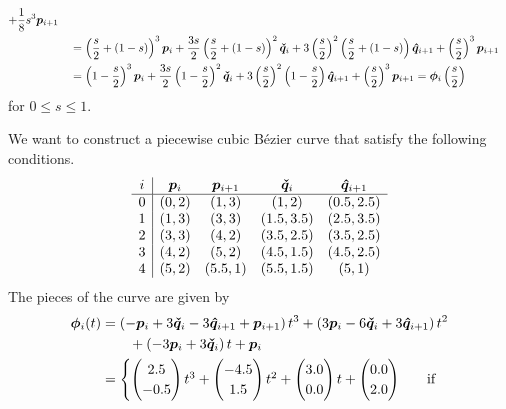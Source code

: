\begin{rmk}
\begin{align*}
+ \frac{1}{8} s^3 \bm{p}_{i+1} \\
&\quad = \left( \frac{s}{2}+(1-s) \right)^3 \bm{p}_i +
\frac{3s}{2}\left(\frac{s}{2} + (1-s) \right)^2 \bm{\check{q}}_i +
3 \left( \frac{s}{2} \right)^2\left(\frac{s}{2}+(1-s) \right)
\bm{\hat{q}}_{i+1} + \left( \frac{s}{2} \right)^3 \bm{p}_{i+1} \\
&\quad = \left( 1 -\frac{s}{2}\right)^3 \bm{p}_i +
\frac{3s}{2}\left( 1- \frac{s}{2}\right)^2 \bm{\check{q}}_i +
3 \left( \frac{s}{2} \right)^2\left(1 - \frac{s}{2}\right) \bm{\hat{q}}_{i+1}
+ \left( \frac{s}{2} \right)^3 \bm{p}_{i+1}
= \bm{\phi}_i\left(\frac{s}{2}\right)
\end{align*}
for $0 \leq s \leq 1$.
\end{rmk}

\begin{egg}
We want to construct a piecewise cubic Bézier curve that satisfy the
following conditions.
\[
\begin{array}{c|cccc}
i & \bm{p}_i & \bm{p}_{i+1} & \bm{\check{q}}_i & \bm{\hat{q}}_{i+1} \\
\hline
0 & (0,2) & (1,3) & (1,2) & (0.5,2.5) \\
1 & (1,3) & (3,3) & (1.5,3.5) & (2.5,3.5) \\
2 & (3,3) & (4,2) & (3.5,2.5) & (3.5,2.5) \\  
3 & (4,2) & (5,2) & (4.5,1.5) & (4.5,2.5) \\
4 & (5,2) & (5.5,1) & (5.5,1.5) & (5,1)
\end{array}
\]
The pieces of the curve are given by
\begin{align*}
\bm{\phi}_i(t) &=
  \left(-\bm{p}_i +3\bm{\check{q}}_i - 3 \bm{\hat{q}}_{i+1} +
\bm{p}_{i+1}\right) t^3 + \left(3 \bm{p}_i -6 \bm{\check{q}}_i
+ 3 \bm{\hat{q}}_{i+1}\right) t^2 \\
&\qquad + \left(-3 \bm{p}_i + 3  \bm{\check{q}}_i\right) t + \bm{p}_i \\
&= \begin{cases}
\begin{pmatrix} 2.5 \\ -0.5 \end{pmatrix} t^3
+ \begin{pmatrix} -4.5 \\ 1.5 \end{pmatrix} t^2
+ \begin{pmatrix} 3.0 \\ 0.0 \end{pmatrix} t
+ \begin{pmatrix} 0.0 \\ 2.0 \end{pmatrix} & \quad \text{if}

\end{cases}
\end{align*}
\end{egg}
